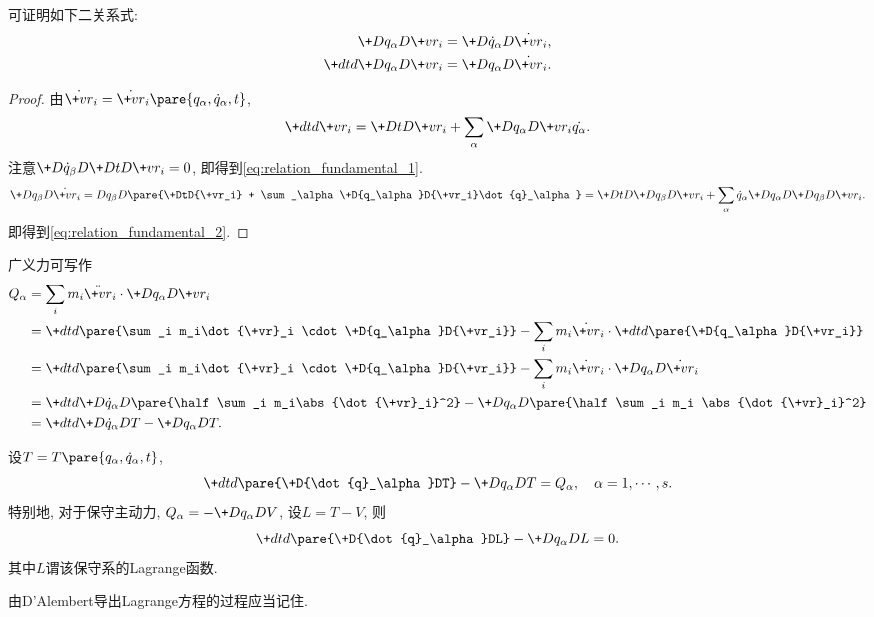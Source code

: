 \documentclass[../LectureNotes.tex]{subfiles}
\begin{document}
可证明如下二关系式:
\begin{align}
    \label{eq:relation_fundamental_1}
    \+D{q_\alpha}D{\+vr_i} &= \+D{\dot{q}_\alpha}D{\dot{\+vr}_i}, \\
    \label{eq:relation_fundamental_2}
    \+dtd{}\+D{q_\alpha}D{\+vr_i} &= \+D{q_\alpha}D{\dot{\+vr}_i}.
\end{align}
\begin{proof}
    由$\dot{\+vr}_i = \dot{\+vr}_i\pare{q_\alpha,\dot{q}_\alpha,t}$,
    \[ \+dtd{\+vr_i} = \+DtD{\+vr_i} + \sum_\alpha \+D{q_\alpha}D{\+vr_i}\dot{q_\alpha}. \]
    注意$\displaystyle \+D{\dot{q}_\beta}D{}\+DtD{\+vr_i} = 0$, 即得到\eqref{eq:relation_fundamental_1}.
    \[ \+D{q_\beta}D{\dot{\+vr}_i} = D{q_\beta}D{}\pare{\+DtD{\+vr_i} + \sum_\alpha \+D{q_\alpha}D{\+vr_i}\dot{q}_\alpha} = \+DtD{}\+D{q_\beta}D{\+vr_i} + \sum_\alpha \dot{q}_\alpha \+D{q_\alpha}D{}\+D{q_\beta}D{\+vr_i}. \]
    即得到\eqref{eq:relation_fundamental_2}.
\end{proof}
广义力可写作
\begin{align*}
    Q_\alpha &= \sum_i m_i\ddot{\+vr}_i \cdot \+D{q_\alpha}D{\+vr_i} \\
    &= \+dtd{} \pare{\sum_i m_i\dot{\+vr}_i \cdot\+D{q_\alpha}D{\+vr_i}} - \sum_i m_i\dot{\+vr}_i \cdot\+dtd{} \pare{\+D{q_\alpha}D{\+vr_i}} \\
    &= \+dtd{} \pare{\sum_i m_i\dot{\+vr}_i \cdot\+D{q_\alpha}D{\+vr_i}} - \sum_i m_i\dot{\+vr}_i\cdot\+D{q_\alpha}D{\dot{\+vr}_i} \\
    &= \+dtd{}\+D{\dot{q}_\alpha}D{} \pare{\half \sum_i m_i\abs{\dot{\+vr}_i}^2} - \+D{q_\alpha}D{} \pare{\half \sum_i m_i \abs{\dot{\+vr}_i}^2} \\
    &= \+dtd{}\+D{\dot{q}_\alpha}DT - \+D{q_\alpha}D{T}.
\end{align*}
\begin{finale}
    \begin{theorem}[Lagrange方程]
        设$T=T\pare{q_\alpha, \dot{q}_\alpha, t}$,
        \[ \+dtd{}\pare{\+D{\dot{q}_\alpha}DT} - \+D{q_\alpha}D{T} = Q_\alpha,\quad \alpha = 1, \cdots, s. \]
        特别地, 对于保守主动力, $Q_\alpha = \displaystyle -\+D{q_\alpha}DV$, 设$L = T-V$, 则
        \[ \+dtd{}\pare{\+D{\dot{q}_\alpha}DL} - \+D{q_\alpha}D{L} = 0. \]
        其中$L$谓该保守系的Lagrange函数.
    \end{theorem}
\end{finale}
\begin{remark}
    由D'Alembert导出Lagrange方程的过程应当记住.
\end{remark}
\end{document}

